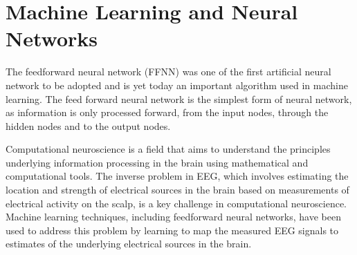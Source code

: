 \documentclass[a4paper, UKenglish, 11pt]{uiomaster}
\begin{document}





%
%


\section{Machine Learning and Neural Networks}
The feedforward neural network (FFNN) was one of the first artificial neural network to be adopted and is yet today an important algorithm used in machine learning. The feed forward neural network is the simplest form of neural network, as information is only processed forward, from the input nodes, through the hidden nodes and to the output nodes.

Computational neuroscience is a field that aims to understand the principles underlying information processing in the brain using mathematical and computational tools. The inverse problem in EEG, which involves estimating the location and strength of electrical sources in the brain based on measurements of electrical activity on the scalp, is a key challenge in computational neuroscience. Machine learning techniques, including feedforward neural networks, have been used to address this problem by learning to map the measured EEG signals to estimates of the underlying electrical sources in the brain.
\end{document}
